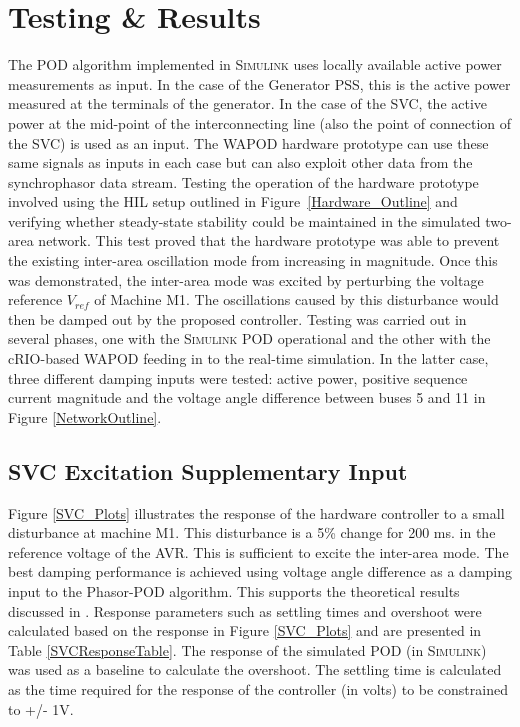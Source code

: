 \documentclass{ieeeaccess}
\begin{document}
\section{Testing \& Results}\label{Results}
The POD algorithm implemented in \textsc{Simulink} uses locally available active power measurements as input. In the case of the Generator PSS, this is the active power measured at the terminals of the generator. In the case of the SVC, the active power at the mid-point of the interconnecting line (also the point of connection of the SVC) is used as an input. The WAPOD hardware prototype can use these same signals as inputs in each case but can also exploit other data from the synchrophasor data stream. Testing the operation of the hardware prototype involved using the HIL setup outlined in Figure~\ref{Hardware_Outline} and verifying whether steady-state stability could be maintained in the simulated two-area network. This test proved that the hardware prototype was able to prevent the existing inter-area oscillation mode from increasing in magnitude. Once this was demonstrated, the inter-area mode was excited by perturbing the voltage reference $V_{ref}$ of Machine M1. The oscillations caused by this disturbance would then be damped out by the proposed controller. Testing was carried out in several phases, one with the \textsc{Simulink} POD operational and the other with the cRIO-based WAPOD feeding in to the real-time simulation. In the latter case, three different damping inputs were tested: active power, positive sequence current magnitude and the voltage angle difference between buses 5 and 11 in Figure \ref{NetworkOutline}.

\subsection{SVC Excitation Supplementary Input}
Figure \ref{SVC_Plots} illustrates the response of the hardware controller to a small disturbance at machine M1. This disturbance is a 5\% change for 200 ms. in the reference voltage of the AVR. This is sufficient to excite the inter-area mode. The best damping performance is achieved using voltage angle difference as a damping input to the Phasor-POD algorithm. This supports the theoretical results discussed in \cite{Yuwa}. Response parameters such as settling times and overshoot were calculated based on the response in Figure \ref{SVC_Plots} and are presented in Table \ref{SVCResponseTable}. The response of the simulated POD (in \textsc{Simulink}) was used as a baseline to calculate the overshoot. The settling time is calculated as the time required for the response of the controller (in volts) to be constrained to +/- 1V.
\end{document}
